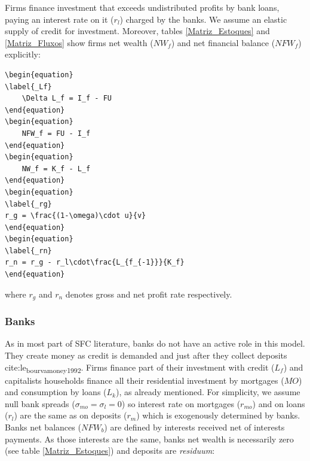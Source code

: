 \documentclass[12pt]{article}
\begin{document}
Firms finance investment that exceeds undistributed profits by bank loans, paying an interest rate on it (\(r_l\)) charged by the banks.
We assume an elastic supply of credit for investment. 
Moreover, tables \ref{Matriz_Estoques} and \ref{Matriz_Fluxos} show firms net wealth (\(NW_f\)) and net financial balance (\(NFW_f\)) explicitly:

\begin{verbatim}
\begin{equation}
\label{_Lf}
    \Delta L_f = I_f - FU
\end{equation}
\begin{equation}
    NFW_f = FU - I_f
\end{equation}
\begin{equation}
    NW_f = K_f - L_f
\end{equation}
\begin{equation}
\label{_rg}
r_g = \frac{(1-\omega)\cdot u}{v}
\end{equation}
\begin{equation}
\label{_rn}
r_n = r_g - r_l\cdot\frac{L_{f_{-1}}}{K_f}
\end{equation}
\end{verbatim}

where \(r_g\) and \(r_n\) denotes gross and net profit rate respectively.

\subsubsection{Banks}
\label{sec:orgcd72b11}

As in most part of SFC literature, banks do not have an active role in this model.
They create money as credit is demanded and just after they collect deposits cite:le\textsubscript{bourva}\textsubscript{money}\textsubscript{1992}. 
Firms finance part of their investment with credit (\(L_f\)) and capitalists households finance all their residential investment by mortgages (\(MO\)) and consumption by loans (\(L_{k}\)), as already mentioned.
For simplicity, we assume null bank spreads (\(\sigma_{mo} = \sigma_l = 0\)) so interest rate on mortgages (\(r_{mo}\)) and on loans (\(r_{l}\))
are the same as on deposits (\(r_{m}\)) which is  exogenously determined by banks.
Banks net balances (\(NFW_b\)) are defined by interests received net of interests payments. 
As those interests are the same, banks net wealth is necessarily zero (see table \ref{Matriz_Estoques}) and deposits are \emph{residuum}:
\end{document}
